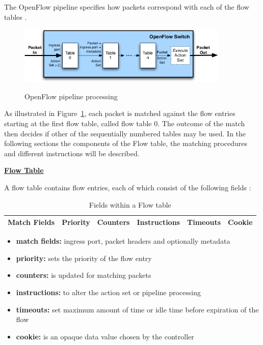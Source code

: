 The OpenFlow pipeline specifies how packets correspond with each of the flow tables \cite{ofspecification}. 

\begin{figure}[H]
\centering
\includegraphics[width=0.9\textwidth]{images/fundamentals/openflow_pipeline_processing.png}
\caption{OpenFlow pipeline processing} \cite{ofspecification}\label{fig:of-pipeline}
\end{figure}

As illustrated in Figure~\ref{fig:of-pipeline}, each packet is matched against the flow entries starting at the first flow table, called flow table 0. The outcome of the match then decides if other of the sequentially numbered tables may be used. In the following sections the components of the Flow table, the matching procedures and different instructions will be described.

\newpage
\textbf{\underline{Flow Table}}

A flow table contains flow entries, each of which consist of the following fields \cite{ofspecification}: 

\begin{table}[H]
\centering

\begin{tabular}{|c|c|c|c|c|c|}
\hline Match Fields & Priority & Counters & Instructions & Timeouts & Cookie \\ 
\hline 
\end{tabular} 

\caption{Fields within a Flow table}
\end{table}

\begin{itemize}
\item \textbf{match fields:} ingress port, packet headers and optionally metadata
\item \textbf{priority:} sets the priority of the flow entry
\item \textbf{counters:} is updated for matching packets
\item \textbf{instructions:} to alter the action set or pipeline processing
\item \textbf{timeouts:} set maximum amount of time or idle time before expiration of the flow
\item \textbf{cookie:} is an opaque data value chosen by the controller
\end{itemize}

